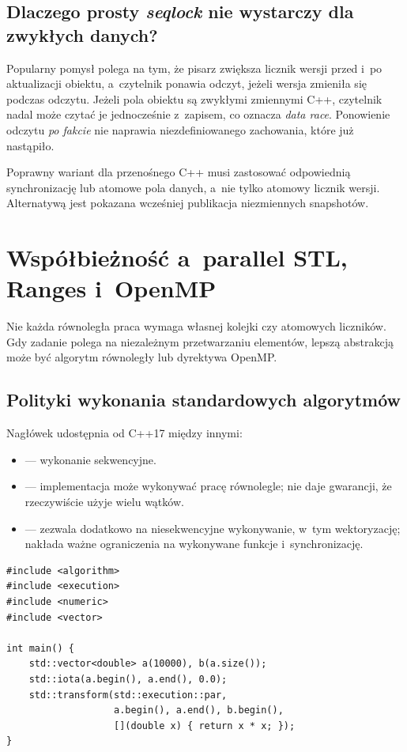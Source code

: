 \subsection{Dlaczego prosty \emph{seqlock} nie wystarczy dla zwykłych danych?}

Popularny pomysł polega na tym, że pisarz zwiększa licznik wersji
przed i~po aktualizacji obiektu, a~czytelnik ponawia odczyt, jeżeli
wersja zmieniła się podczas odczytu. Jeżeli pola obiektu są zwykłymi
zmiennymi C++, czytelnik nadal może czytać je jednocześnie z~zapisem,
co oznacza \emph{data race}. Ponowienie odczytu \emph{po fakcie}
nie naprawia niezdefiniowanego zachowania, które już nastąpiło.

Poprawny wariant dla przenośnego C++ musi zastosować odpowiednią
synchronizację lub atomowe pola danych, a~nie tylko atomowy licznik
wersji. Alternatywą jest pokazana wcześniej publikacja niezmiennych
snapshotów.

\section{Współbieżność a~parallel STL, Ranges i~OpenMP}
\label{sec:cpp16-interop}

Nie każda równoległa praca wymaga własnej kolejki czy atomowych
liczników. Gdy zadanie polega na niezależnym przetwarzaniu elementów,
lepszą abstrakcją może być algorytm równoległy lub dyrektywa OpenMP.

\subsection{Polityki wykonania standardowych algorytmów}

Nagłówek  udostępnia od C++17 między innymi:
\begin{itemize}
\item {} --- wykonanie sekwencyjne.
\item {} --- implementacja może wykonywać pracę
      równolegle; nie daje gwarancji, że rzeczywiście użyje wielu wątków.
\item {} --- zezwala dodatkowo na
      niesekwencyjne wykonywanie, w~tym wektoryzację; nakłada ważne
      ograniczenia na wykonywane funkcje i~synchronizację.
\end{itemize}

\begin{lstlisting}[caption={Równoległa transformacja bez współdzielonych zapisów (C++17).}]
#include <algorithm>
#include <execution>
#include <numeric>
#include <vector>

int main() {
    std::vector<double> a(10000), b(a.size());
    std::iota(a.begin(), a.end(), 0.0);
    std::transform(std::execution::par,
                   a.begin(), a.end(), b.begin(),
                   [](double x) { return x * x; });
}
\end{lstlisting}


